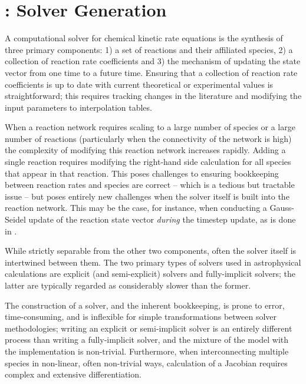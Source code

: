 \section{\dengo{}: Solver Generation}

A computational solver for chemical kinetic rate equations is the synthesis of
three primary components: 1) a set of reactions and their affiliated species,
2) a collection of reaction rate coefficients and 3) the mechanism of updating
the state vector from one time to a future time.  Ensuring that a collection of
reaction rate coefficients is up to date with current theoretical or
experimental values is straightforward; this requires tracking changes in the
literature and modifying the input parameters to interpolation tables.

When a reaction network requires scaling to a large number of species
or a large number of reactions (particularly when the connectivity of the
network is high) the complexity of modifying this reaction network increases
rapidly.  Adding a single reaction requires modifying the right-hand side
calculation for all species that appear in that reaction.  This poses
challenges to ensuring bookkeeping between reaction rates and species are
correct -- which is a tedious but tractable issue -- but poses entirely new
challenges when the solver itself is built into the reaction network.  This may
be the case, for instance, when conducting a Gauss-Seidel update of the
reaction state vector \textit{during} the timestep update, as is done in
\grackle{}.

While strictly separable from the other two components, often the solver itself
is intertwined between them.  The two primary types of solvers used in
astrophysical calculations are explicit (and semi-explicit) solvers  and
fully-implicit solvers; the latter are typically regarded as considerably
slower than the former.

The construction of a solver, and the inherent
bookkeeping, is prone to error, time-consuming, and is inflexible for simple
transformations between solver methodologies; writing an explicit or
semi-implicit solver is an entirely different process than writing a
fully-implicit solver, and the mixture of the model with the implementation is
non-trivial.  Furthermore, when interconnecting multiple species in non-linear,
often non-trivial ways, calculation of a Jacobian requires complex and
extensive differentiation.

